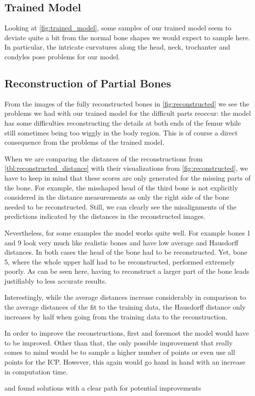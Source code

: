 \subsection{Trained Model}
\label{subsec:trainedmodeldisc}

Looking at \autoref{fig:trained_model}, some samples of our trained model seem to deviate quite a bit from the normal bone shapes we would expect to sample here. 
In particular, the intricate curvatures along the head, neck, trochanter and condyles pose problems for our model.


\subsection{Reconstruction of Partial Bones}
\label{subsec:reconresultsdisc}

From the images of the fully reconstructed bones in \autoref{fig:reconstructed} we see the problems we had with our trained model for the difficult parts reoccur: the model has some difficulties reconstructing the details at both ends of the femur while still sometimes being too wiggly in the body region. 
This is of course a direct consequence from the problems of the trained model.

When we are comparing the distances of the reconstructions from \autoref{tbl:reconstructed_distance} with their visualizations from \autoref{fig:reconstructed}, we have to keep in mind that these scores are only generated for the missing parts of the bone. 
For example, the misshaped head of the third bone is not explicitly considered in the distance measurements as only the right side of the bone needed to be reconstructed. 
Still, we can clearly see the misalignments of the predictions indicated by the distances in the reconstructed images.

Nevertheless, for some examples the model works quite well.
For example bones 1 and 9 look very much like realistic bones and have low average and Hausdorff distances. 
In both cases the head of the bone had to be reconstructed. 
Yet, bone 5, where the whole upper half had to be reconstructed, performed extremely poorly. 
As can be seen here, having to reconstruct a larger part of the bone leads justifiably to less accurate results.

Interestingly, while the average distances increase considerably in comparison to the average distances of the fit to the training data, the Hausdorff distance only increases by half when going from the training data to the reconstruction.

In order to improve the reconstructions, first and foremost the model would have to be improved. 
Other than that, the only possible improvement that really comes to mind would be to sample a higher number of points or even use all points for the ICP.
However, this again would go hand in hand with an increase in computation time.

and found solutions with a clear path for potential improvements